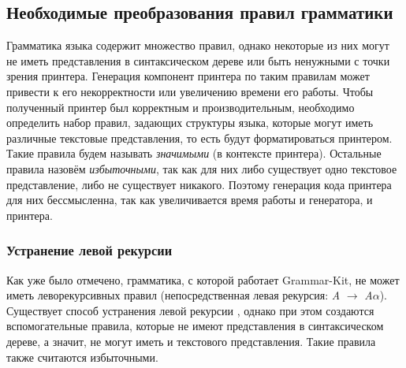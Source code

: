 \subsection{Необходимые преобразования правил грамматики}%
Грамматика языка содержит множество правил, однако некоторые из них могут не иметь представления в синтаксическом дереве или быть ненужными с точки зрения принтера.
Генерация компонент принтера по таким правилам может привести к его некорректности или увеличению времени его работы.
Чтобы полученный принтер был корректным и производительным, необходимо определить набор правил, задающих структуры языка, которые могут иметь различные текстовые представления, то есть будут форматироваться принтером.
Такие правила будем называть \emph{значимыми} (в контексте принтера).
Остальные правила назовём \emph{избыточными}, так как для них либо существует одно текстовое представление, либо не существует никакого.
Поэтому генерация кода принтера для них бессмысленна, так как увеличивается время работы и генератора, и принтера.


\subsubsection{Устранение левой рекурсии}
Как уже было отмечено, грамматика, с которой работает Grammar-Kit, не может иметь леворекурсивных правил (непосредственная левая рекурсия: \emph{A} $\rightarrow$ \emph{A}$\alpha$).
Существует способ устранения левой рекурсии \cite{book:ulman}, однако при этом создаются вспомогательные правила, которые не имеют представления в синтаксическом дереве, а значит, не могут иметь и текстового представления.
Такие правила также считаются избыточными.

